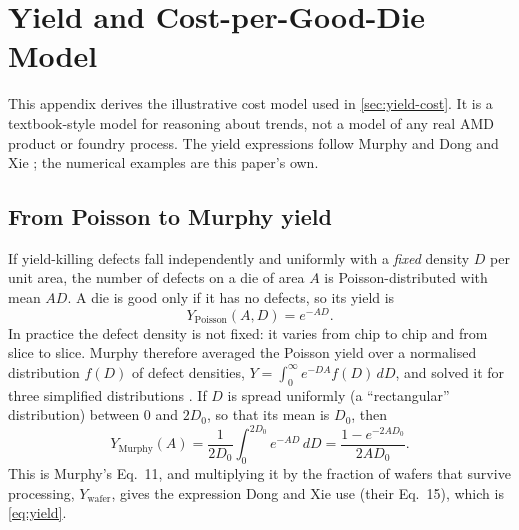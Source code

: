 \clearpage
\section{Yield and Cost-per-Good-Die Model}
\label{app:yield-cost}

This appendix derives the illustrative cost model used in \cref{sec:yield-cost}. It is a textbook-style model for reasoning about trends, not a model of any real AMD product or foundry process. The yield expressions follow Murphy \cite{murphyCostsizeOptimaMonolithic1964} and Dong and Xie \cite{dongSystemlevelCostAnalysis2009}; the numerical examples are this paper's own.

\subsection{From Poisson to Murphy yield}
If yield-killing defects fall independently and uniformly with a \emph{fixed} density $D$ per unit area, the number of defects on a die of area $A$ is Poisson-distributed with mean $AD$. A die is good only if it has no defects, so its yield is
\begin{equation*}
  Y_{\mathrm{Poisson}}(A, D) = e^{-AD}.
\end{equation*}
In practice the defect density is not fixed: it varies from chip to chip and from slice to slice. Murphy therefore averaged the Poisson yield over a normalised distribution $f(D)$ of defect densities, $Y = \int_0^\infty e^{-DA} f(D)\,dD$, and solved it for three simplified distributions \cite[Eqs.~7--11]{murphyCostsizeOptimaMonolithic1964}. If $D$ is spread uniformly (a ``rectangular'' distribution) between $0$ and $2D_0$, so that its mean is $D_0$, then
\begin{equation*}
  Y_{\mathrm{Murphy}}(A) = \frac{1}{2D_0}\int_{0}^{2D_0} e^{-AD}\,dD = \frac{1 - e^{-2AD_0}}{2AD_0}.
\end{equation*}
This is Murphy's Eq.~11, and multiplying it by the fraction of wafers that survive processing, $Y_{\mathrm{wafer}}$, gives the expression Dong and Xie use (their Eq.~15), which is \cref{eq:yield}.

